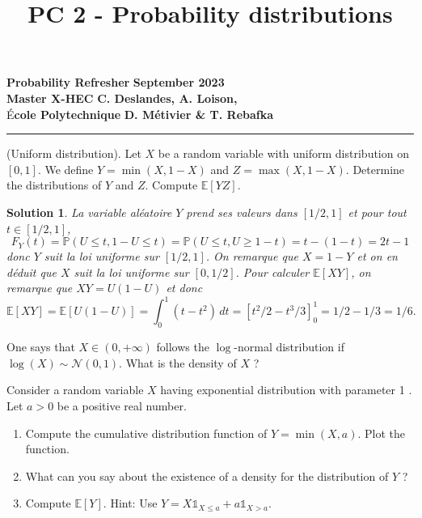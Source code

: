 \documentclass{article}
\title{PC 2 - Probability distributions}
\author{}
\date{}
\newtheorem{solution}{Solution}
\begin{document}
\begin{flushleft}
  \textbf{Probability Refresher} \hfill \textbf{September 2023} \\
  \textbf{Master X-HEC} \hfill \textbf{C. Deslandes, A. Loison,} \\
  É\textbf{cole Polytechnique} \hfill \textbf{D. Métivier \& T. Rebafka}
\end{flushleft}

{\let\newpage\relax\maketitle}
\vspace{-1.3cm}
\hrule

\vspace{0.5cm}

\begin{Exercise} (Uniform distribution). Let $X$ be a random variable with uniform distribution on $[0,1]$. We define $Y=\min (X, 1-X)$ and $Z=\max (X, 1-X)$. Determine the distributions of $Y$ and $Z$. Compute $\mathbb{E}[Y Z]$.
\end{Exercise}

\begin{solution}
  La variable al\'{e}atoire $Y$ prend ses valeurs dans $[1/2,1]$ et pour tout $t\in[1/2,1]$,
  \[
    F_Y(t) = \mathbb{P}(U\leq t,1-U\leq t) = \mathbb{P}(U\leq t,U\geq 1-t)
    = t - (1-t) = 2t-1
  \]
  donc $Y$ suit la loi uniforme sur $[1/2,1]$. On remarque que $X = 1-Y$ et on en
  d\'{e}duit que $X$ suit la loi uniforme sur $[0,1/2]$. Pour calculer
  $\mathbb{E}[XY]$, on remarque que $XY = U(1-U)$ et donc
  \[
    \mathbb{E}[XY]
    = \mathbb{E}[U(1-U)]
    = \int_0^{1}\!(t-t^2)\,dt
      = [t^2/2-t^3/3]_0^{1}
    = 1/2-1/3=1/6.
  \]
\end{solution}

\begin{Exercise}
  One says that $X \in(0,+\infty)$ follows the $\log$-normal distribution if $\log (X) \sim \mathcal{N}(0,1)$. What is the density of $X$ ?
\end{Exercise}

\begin{Exercise}
  Consider a random variable $X$ having exponential distribution with parameter 1 . Let $a>0$ be a positive real number.
  \begin{enumerate}
    \item Compute the cumulative distribution function of $Y=\min (X, a)$. Plot the
          function.

    \item What can you say about the existence of a density for the distribution of $Y$ ?

    \item Compute $\mathbb{E}[Y]$. Hint: Use $Y=X \mathbb{1}_{X \leq a}+a
            \mathbb{1}_{X>a}$.
  \end{enumerate}
\end{Exercise}
\end{document}
